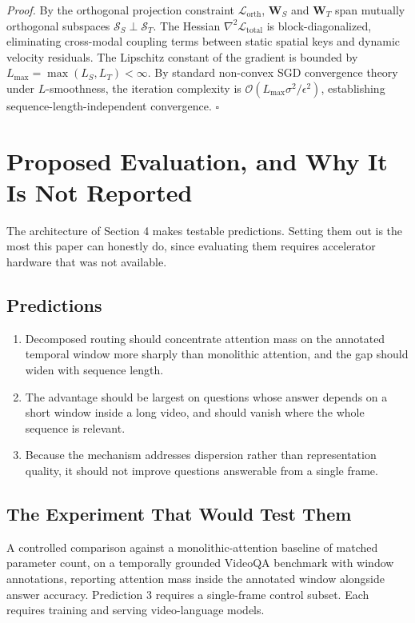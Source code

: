 \documentclass{article}
\begin{document}
\textit{Proof.} By the orthogonal projection constraint $\mathcal{L}_{\text{orth}}$, $\mathbf{W}_S$ and $\mathbf{W}_T$ span mutually orthogonal subspaces $\mathcal{S}_S \perp \mathcal{S}_T$. The Hessian $\nabla^2 \mathcal{L}_{\text{total}}$ is block-diagonalized, eliminating cross-modal coupling terms between static spatial keys and dynamic velocity residuals. The Lipschitz constant of the gradient is bounded by $L_{\max} = \max(L_S, L_T) < \infty$. By standard non-convex SGD convergence theory under $L$-smoothness, the iteration complexity is $\mathcal{O}(L_{\max} \sigma^2 / \epsilon^2)$, establishing sequence-length-independent convergence. $\square$




\section{Proposed Evaluation, and Why It Is Not Reported}


The architecture of Section 4 makes testable predictions. Setting them out is the most this paper can honestly do, since evaluating them requires accelerator hardware that was not available.


\subsection{Predictions}


\begin{enumerate}
  \item Decomposed routing should concentrate attention mass on the annotated temporal window more sharply than monolithic attention, and the gap should widen with sequence length.
  \item The advantage should be largest on questions whose answer depends on a short window inside a long video, and should vanish where the whole sequence is relevant.
  \item Because the mechanism addresses dispersion rather than representation quality, it should not improve questions answerable from a single frame.
\end{enumerate}


\subsection{The Experiment That Would Test Them}


A controlled comparison against a monolithic-attention baseline of matched parameter count, on a temporally grounded VideoQA benchmark with window annotations, reporting attention mass inside the annotated window alongside answer accuracy. Prediction 3 requires a single-frame control subset. Each requires training and serving video-language models.
\end{document}
